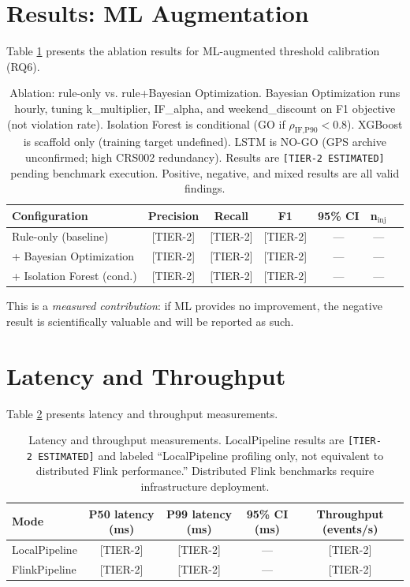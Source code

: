 \section{Results: ML Augmentation}
\label{sec:results-ml}

Table \ref{tab:results-ml} presents the ablation results for ML-augmented
threshold calibration (RQ6).

\begin{table}[htbp]
  \centering
  \caption{Ablation: rule-only vs. rule+Bayesian Optimization.
    Bayesian Optimization runs hourly, tuning k\_multiplier, IF\_alpha,
    and weekend\_discount on F1 objective (not violation rate).
    Isolation Forest is conditional (GO if $\rho_{\text{IF,P90}} < 0.8$).
    XGBoost is scaffold only (training target undefined).
    LSTM is NO-GO (GPS archive unconfirmed; high CRS002 redundancy).
    Results are \texttt{[TIER-2\ ESTIMATED]} pending benchmark execution.
    Positive, negative, and mixed results are all valid findings.}
  \label{tab:results-ml}
  \begin{tabular}{lcccccc}
    \toprule
    Configuration & Precision & Recall & F1 & 95\% CI & n$_{\text{inj}}$ \\
    \midrule
    Rule-only (baseline) & [TIER-2] & [TIER-2] & [TIER-2] & — & — \\
    + Bayesian Optimization & [TIER-2] & [TIER-2] & [TIER-2] & — & — \\
    + Isolation Forest (cond.) & [TIER-2] & [TIER-2] & [TIER-2] & — & — \\
    \bottomrule
  \end{tabular}
\end{table}

This is a \textit{measured contribution}: if ML provides no improvement,
the negative result is scientifically valuable and will be reported as such.

\section{Latency and Throughput}
\label{sec:results-latency}

Table \ref{tab:results-latency} presents latency and throughput measurements.

\begin{table}[htbp]
  \centering
  \caption{Latency and throughput measurements. LocalPipeline results are
    \texttt{[TIER-2\ ESTIMATED]} and labeled ``LocalPipeline profiling only,
    not equivalent to distributed Flink performance.'' Distributed Flink
    benchmarks require infrastructure deployment.}
  \label{tab:results-latency}
  \begin{tabular}{lcccc}
    \toprule
    Mode & P50 latency (ms) & P99 latency (ms) & 95\% CI (ms) &
    Throughput (events/s) \\
    \midrule
    LocalPipeline & [TIER-2] & [TIER-2] & — & [TIER-2] \\
    FlinkPipeline & [TIER-2] & [TIER-2] & — & [TIER-2] \\
    \bottomrule
  \end{tabular}
\end{table}

